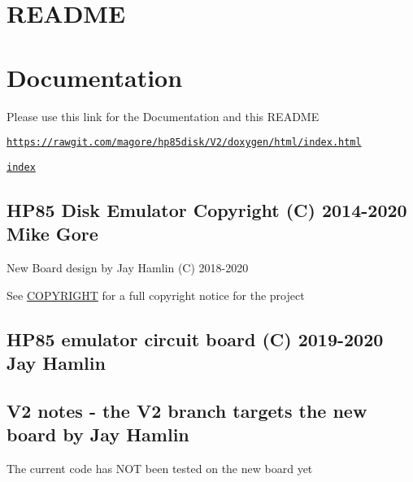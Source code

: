 \hypertarget{md_README_README}{}\section{R\+E\+A\+D\+ME}\label{md_README_README}
\section*{Documentation}


\begin{DoxyItemize}
\item Please use this link for the Documentation and this R\+E\+A\+D\+ME
\begin{DoxyItemize}
\item \href{https://rawgit.com/magore/hp85disk/V2/doxygen/html/index.html}{\tt https\+://rawgit.\+com/magore/hp85disk/\+V2/doxygen/html/index.\+html}
\item \href{doxygen/html/index.html}{\tt index}
\end{DoxyItemize}
\end{DoxyItemize}

\subsection*{H\+P85 Disk Emulator Copyright (C) 2014-\/2020 Mike Gore}


\begin{DoxyItemize}
\item New Board design by Jay Hamlin (C) 2018-\/2020
\item See \hyperlink{COPYRIGHT_8md}{C\+O\+P\+Y\+R\+I\+G\+HT} for a full copyright notice for the project
\end{DoxyItemize}

\subsection*{H\+P85 emulator circuit board (C) 2019-\/2020 Jay Hamlin}

\subsection*{V2 notes -\/ the V2 branch targets the new board by Jay Hamlin}


\begin{DoxyItemize}
\item The current code has N\+OT been tested on the new board yet
\end{DoxyItemize}

